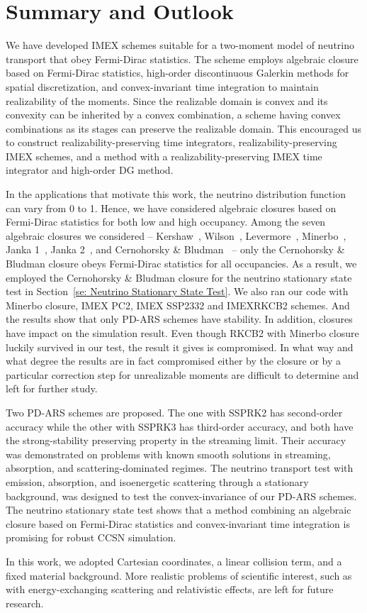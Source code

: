 \section{Summary and Outlook}\label{se:Summary}

We have developed IMEX schemes suitable for a two-moment model of neutrino transport that obey Fermi-Dirac statistics.
The scheme employs algebraic closure based on Fermi-Dirac statistics, high-order discontinuous Galerkin methods for spatial discretization, and convex-invariant time integration to maintain realizability of the moments.  
Since the realizable domain is convex and its convexity can be inherited by a convex combination, a scheme having convex combinations as its stages can preserve the realizable domain.
This encouraged us to construct realizability-preserving time integrators, realizability-preserving IMEX schemes, and a method with a realizability-preserving IMEX time integrator and high-order DG method.  

In the applications that motivate this work, the neutrino distribution function can vary from 0 to 1.  
Hence, we have considered algebraic closures based on Fermi-Dirac statistics for both low and high occupancy.  
Among the seven algebraic closures we considered -- Kershaw~\cite{kershaw_1976}, Wilson~\cite{wilson_1975,leblancWilson_1970}, Levermore~\cite{levermore_1984}, Minerbo~\cite{minerbo_1978}, Janka 1~\cite{janka_1991}, Janka 2~\cite{janka_1992}, and Cernohorsky \& Bludman~\cite{cernohorskyBludman_1994} -- only the Cernohorsky \& Bludman closure obeys Fermi-Dirac statistics for all occupancies.  
As a result, we employed the Cernohorsky \& Bludman closure for the neutrino stationary state test in Section~\ref{se: Neutrino Stationary State Test}.
We also ran our code with Minerbo closure, IMEX PC2, IMEX SSP2332 and IMEXRKCB2 schemes.
And the results show that only PD-ARS schemes have stability.
In addition, closures have impact on the simulation result.
Even though RKCB2 with Minerbo closure luckily survived in our test, the result it gives is compromised.
In what way and what degree the results are in fact compromised either by the closure or by a particular correction step for unrealizable moments are difficult to determine and left for further study.


Two PD-ARS schemes are proposed.
The one with SSPRK2 has second-order accuracy while the other with SSPRK3 has third-order accuracy, and both have the strong-stability preserving property in the streaming limit.  
Their accuracy was demonstrated on problems with known smooth solutions in streaming, absorption, and scattering-dominated regimes.
The neutrino transport test with emission, absorption, and isoenergetic scattering through a stationary background, was designed to test the convex-invariance of our PD-ARS schemes. 
The neutrino stationary state test shows that a method combining an algebraic closure based on Fermi-Dirac statistics and convex-invariant time integration is promising for robust CCSN simulation.

In this work, we adopted Cartesian coordinates, a linear collision term, and a fixed material background.
More realistic problems of scientific interest, such as with energy-exchanging scattering and relativistic effects, are left for future research.